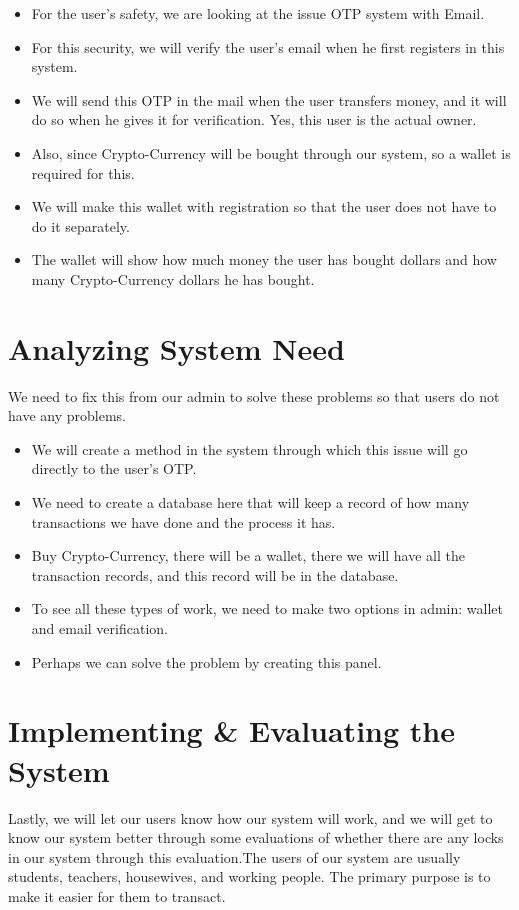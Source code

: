 \documentclass{article}
\begin{document}
\begin{itemize}
\item For the user's safety, we are looking at the issue OTP system with Email.
\item For this security, we will verify the user's email when he first registers in this system.
\item We will send this OTP in the mail when the user transfers money, and it will do so when he gives it for verification. Yes, this user is the actual owner.
\item Also, since Crypto-Currency will be bought through our system, so a wallet is required for this.
\item We will make this wallet with registration so that the user does not have to do it separately.
\item The wallet will show how much money the user has bought dollars and how many Crypto-Currency dollars he has bought.

\end{itemize}

\newpage

\section{Analyzing System Need}
We need to fix this from our admin to solve these problems so that users do not have any problems.
\begin{itemize}
\item We will create a method in the system through which this issue will go directly to the user's OTP.
\item We need to create a database here that will keep a record of how many transactions we have done and the process it has.
\item Buy Crypto-Currency, there will be a wallet, there we will have all the transaction records, and this record will be in the database.
\item To see all these types of work, we need to make two options in admin: wallet and email verification.
\item Perhaps we can solve the problem by creating this panel.

\end{itemize}

\section{Implementing \& Evaluating the System}
Lastly, we will let our users know how our system will work, and we will get to know our system better through some evaluations of whether there are any locks in our system through this evaluation.The users of our system are usually students, teachers, housewives, and working people. The primary purpose is to make it easier for them to transact.
\end{document}
